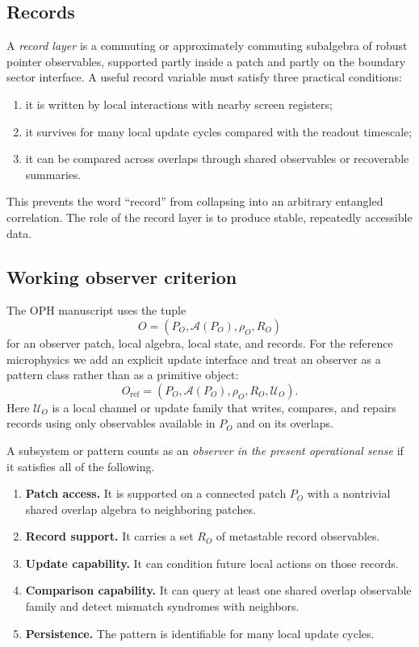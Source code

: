 \documentclass[11pt]{article}
\begin{document}
\subsection{Records}

A \emph{record layer} is a commuting or approximately commuting subalgebra of robust pointer
observables, supported partly inside a patch and partly on the boundary sector interface. A
useful record variable must satisfy three practical conditions:
\begin{enumerate}[leftmargin=2em]
\item it is written by local interactions with nearby screen registers;
\item it survives for many local update cycles compared with the readout timescale;
\item it can be compared across overlaps through shared observables or recoverable summaries.
\end{enumerate}

This prevents the word ``record'' from collapsing into an arbitrary entangled correlation.
The role of the record layer is to produce stable, repeatedly accessible data.

\subsection{Working observer criterion}

The OPH manuscript uses the tuple
\begin{equation}
O=(P_O,\mathcal A(P_O),\rho_O,R_O)
\end{equation}
for an observer patch, local algebra, local state, and records. For the reference
microphysics we add an explicit update interface and treat an observer as a pattern class
rather than as a primitive object:
\begin{equation}
O_{\mathrm{ref}}=(P_O,\mathcal A(P_O),\rho_O,R_O,\mathcal U_O).
\end{equation}
Here $\mathcal U_O$ is a local channel or update family that writes, compares, and repairs
records using only observables available in $P_O$ and on its overlaps.

A subsystem or pattern counts as an \emph{observer in the present operational sense} if it
satisfies all of the following.
\begin{enumerate}[leftmargin=2em]
\item \textbf{Patch access.} It is supported on a connected patch $P_O$ with a nontrivial
shared overlap algebra to neighboring patches.
\item \textbf{Record support.} It carries a set $R_O$ of metastable record observables.
\item \textbf{Update capability.} It can condition future local actions on those records.
\item \textbf{Comparison capability.} It can query at least one shared overlap observable
family and detect mismatch syndromes with neighbors.
\item \textbf{Persistence.} The pattern is identifiable for many local update cycles.
\end{enumerate}
\end{document}
